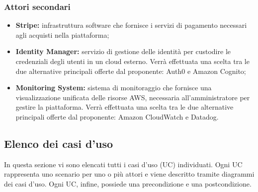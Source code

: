 \subsubsection{Attori secondari}
\begin{itemize}
\item \textbf{Stripe:} infrastruttura software che fornisce i servizi di pagamento necessari agli acquisti nella piattaforma;
\item \textbf{Identity Manager:} servizio di gestione delle identità per custodire le credenziali degli utenti in un cloud esterno. Verrà effettuata una scelta tra le due alternative principali offerte dal proponente: Auth0 e Amazon Cognito;
\item \textbf{Monitoring System:} sistema di monitoraggio che fornisce una visualizzazione unificata delle risorse AWS, necessaria all'amministratore per gestire la piattaforma. Verrà effettuata una scelta tra le due alternative principali offerte dal proponente: Amazon CloudWatch e Datadog.
\end{itemize}
\subsection{Elenco dei casi d'uso}
In questa sezione vi sono elencati tutti i casi d'uso (UC) individuati. Ogni UC rappresenta uno scenario per uno o più attori e viene descritto tramite diagrammi dei casi d'uso. Ogni UC, infine, possiede una precondizione e una postcondizione. \\











